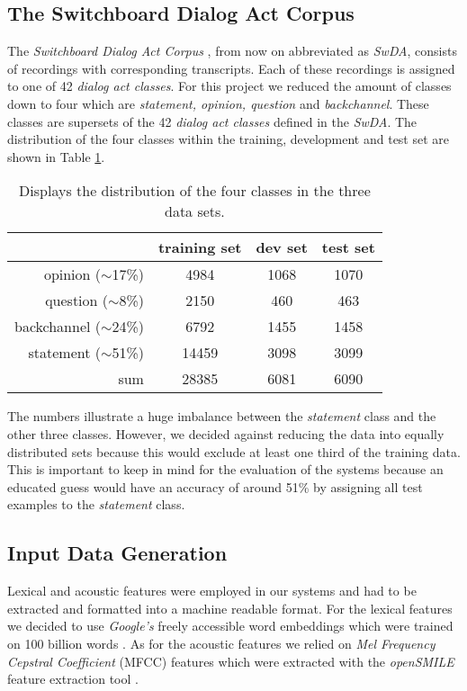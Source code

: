 \documentclass[11pt,a4paper]{article}
\begin{document}
	\subsection{The Switchboard Dialog Act Corpus}
	The \textit{Switchboard Dialog Act Corpus} \cite{switchboard}, from now on abbreviated as \textit{SwDA}, consists of recordings with corresponding transcripts. Each of these recordings is assigned to one of 42 \textit{dialog act classes}. For this project we reduced the amount of classes down to four which are \textit{statement, opinion, question} and \textit{backchannel}. These classes are supersets of the 42 \textit{dialog act classes} defined in the \textit{SwDA}. The distribution of the four classes within the training, development and test set are shown in Table \ref{tab:dataDistribution}.
	\begin{table}[]
		\begin{tabular}{ r | c c c }
			& training set & dev set & test set \\
			\hline
			opinion ($\sim$17\%) & 4984 & 1068 & 1070 \\
			question ($\sim$8\%) & 2150 & 460 & 463 \\
			backchannel ($\sim$24\%) & 6792 & 1455 & 1458  \\
			statement ($\sim$51\%) & 14459 & 3098 &  3099  \\
			\hline
			sum & 28385 & 6081 & 6090 \\
		\end{tabular}
		\caption{Displays the distribution of the four classes in the three data sets.}
		\label{tab:dataDistribution}
	\end{table}	
	The numbers illustrate a huge imbalance between the \textit{statement} class and the other three classes. However, we decided against reducing the data into equally distributed sets because this would exclude at least one third of the training data. This is important to keep in mind for the evaluation of the systems because an educated guess would have an accuracy of around 51\% by assigning all test examples to the \textit{statement} class.

	\subsection{Input Data Generation}
	Lexical and acoustic features were employed in our systems and had to be extracted and formatted into a machine readable format. For the lexical features we decided to use \textit{Google's} freely accessible word embeddings which were trained on 100 billion words \cite{word2vec}. As for the acoustic features we relied on \textit{Mel Frequency Cepstral Coefficient} (MFCC) features which were extracted with the \textit{openSMILE} feature extraction tool \cite{opensmile}.
	
\end{document}
